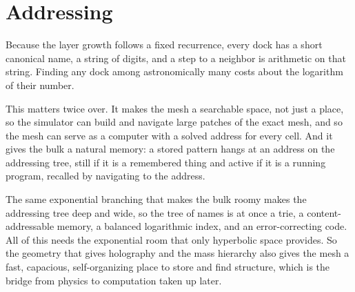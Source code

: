\section{Addressing}

Because the layer growth follows a fixed recurrence, every dock has a short canonical name, a string of digits, and a step to a neighbor is arithmetic on that string. Finding any dock among astronomically many costs about the logarithm of their number.

This matters twice over. It makes the mesh a searchable space, not just a place, so the simulator can build and navigate large patches of the exact mesh, and so the mesh can serve as a computer with a solved address for every cell. And it gives the bulk a natural memory: a stored pattern hangs at an address on the addressing tree, still if it is a remembered thing and active if it is a running program, recalled by navigating to the address.

The same exponential branching that makes the bulk roomy makes the addressing tree deep and wide, so the tree of names is at once a trie, a content-addressable memory, a balanced logarithmic index, and an error-correcting code. All of this needs the exponential room that only hyperbolic space provides. So the geometry that gives holography and the mass hierarchy also gives the mesh a fast, capacious, self-organizing place to store and find structure, which is the bridge from physics to computation taken up later.
